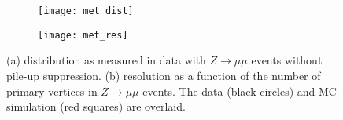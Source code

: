 \begin{figure}[htb!]
\centering
\begin{subfigure}[t]{0.48\textwidth}
\texttt{[image: met\_dist]}
\subcaption{}
\label{fig:exp.reco.met_dist}
\end{subfigure}
\begin{subfigure}[t]{0.48\textwidth}
\texttt{[image: met\_res]}
\subcaption{}
\label{fig:exp.reco.met_res}
\end{subfigure}
\vspace{-0.25cm}
\caption{
(a) \met distribution as measured in data with $Z\to\mu\mu$ events without pile-up suppression.
(b) \met resolution as a function of the number of primary vertices in $Z\to\mu\mu$ events. The data (black circles) and MC simulation (red squares) are overlaid. 
}
\label{fig:exp.reco.met}
\end{figure} 
